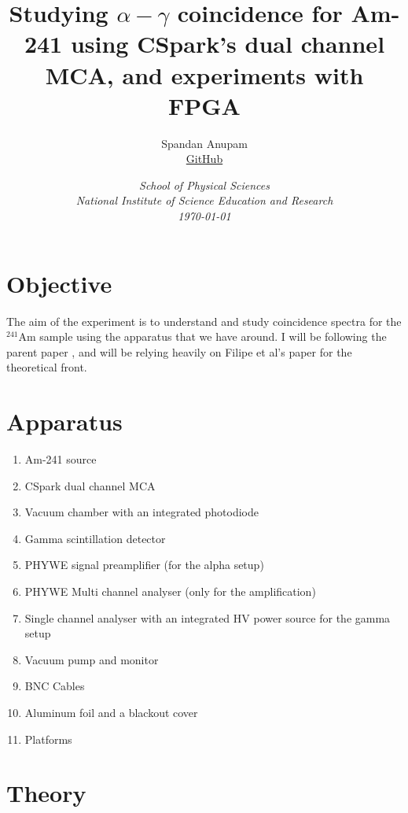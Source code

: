 \documentclass{double}
\begin{document}
\title{Studying $\alpha - \gamma$ coincidence for Am-241 using CSpark's dual channel MCA, and experiments with FPGA}
\author{Spandan Anupam\\%
\href{https://github.com/surelynottrue/}{GitHub}}
\date{%
	\small\itshape School of Physical Sciences\\%
	\normalfont National Institute of Science Education and Research\\[2ex]%
	\normalsize\today}
\maketitle

\begin{multicols*}{2}
\tableofcontents

\section{Objective}
The aim of the experiment is to understand and study
coincidence spectra for the $^{241}$Am sample using the
apparatus that we have around. I will be following the
parent paper \cite{vret}, and will be relying heavily on
Filipe et al's paper \cite{filipe} for the theoretical
front.

\section{Apparatus}
\begin{enumerate}
    \item Am-241 source
    \item CSpark dual channel MCA
    \item Vacuum chamber with an integrated photodiode
    \item Gamma scintillation detector
    \item PHYWE signal preamplifier (for the alpha setup)
    \item PHYWE Multi channel analyser (only for the amplification)
    \item Single channel analyser with an integrated HV power source for the gamma setup
    \item Vacuum pump and monitor
    \item BNC Cables
    \item Aluminum foil and a blackout cover
    \item Platforms
\end{enumerate}

\section{Theory}

\end{multicols*}
\end{document}
